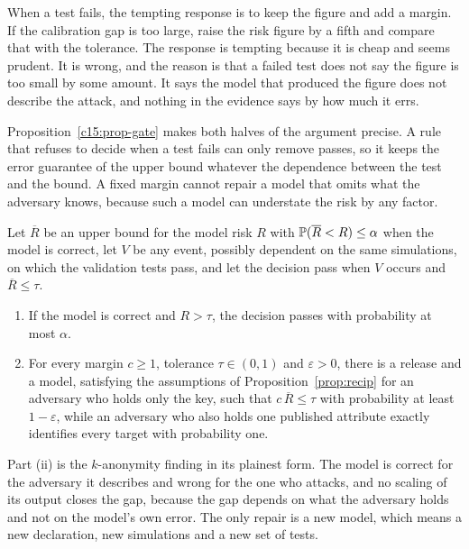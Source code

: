 When a test fails, the tempting response is to keep the figure and add a margin. If
the calibration gap is too large, raise the risk figure by a fifth and compare that
with the tolerance. The response is tempting because it is cheap and seems prudent.
It is wrong, and the reason is that a failed test does not say the figure is too
small by some amount. It says the model that produced the figure does not describe
the attack, and nothing in the evidence says by how much it errs.

Proposition~\ref{c15:prop-gate} makes both halves of the argument precise. A rule
that refuses to decide when a test fails can only remove passes, so it keeps the
error guarantee of the upper bound whatever the dependence between the test and the
bound. A fixed margin cannot repair a model that omits what the adversary knows,
because such a model can understate the risk by any factor.

\begin{proposition}\label{c15:prop-gate}
Let $\overline{R}$ be an upper bound for the model risk $R$ with
$\mathbb{P}(\overline{R} < R) \le \alpha$ when the model is correct, let $V$ be any event,
possibly dependent on the same simulations, on which the validation tests pass, and
let the decision pass when $V$ occurs and $\overline{R} \le \tau$.
\begin{enumerate}
\item[(i)] If the model is correct and $R > \tau$, the decision passes with
probability at most $\alpha$.
\item[(ii)] For every margin $c \ge 1$, tolerance $\tau \in (0,1)$ and
$\varepsilon > 0$, there is a release and a model, satisfying the assumptions of
Proposition~\ref{prop:recip} for an adversary who holds only the key, such that
$c\,\overline{R} \le \tau$ with probability at least $1 - \varepsilon$, while an
adversary who also holds one published attribute exactly identifies every target
with probability one.
\end{enumerate}
\end{proposition}

Part (ii) is the $k$-anonymity finding in its plainest form. The model is correct
for the adversary it describes and wrong for the one who attacks, and no scaling of
its output closes the gap, because the gap depends on what the adversary holds and not on the model's own error. The only repair is a new model, which means a new
declaration, new simulations and a new set of tests.

